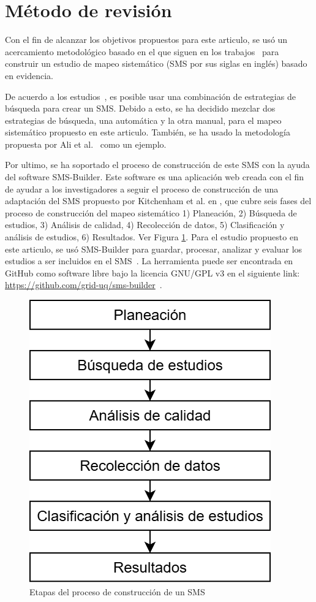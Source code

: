 \section{Método de revisión}\label{sec:metodo-revision}
Con el fin de alcanzar los objetivos propuestos para este articulo, se usó un acercamiento metodológico basado en el que siguen en los trabajos~\cite{Kitchenham2010792, budgen2008using} para construir un estudio de mapeo sistemático (SMS por sus siglas en inglés) basado en evidencia.

De acuerdo a los estudios~\cite{Erica2017HybridSS, Nguyen201562}, es posible usar una combinación de estrategias de búsqueda para crear un SMS. Debido a esto, se ha decidido mezclar dos estrategias de búsqueda, una automática y la otra manual, para el mapeo sistemático propuesto en este articulo. También, se ha usado la metodología propuesta por Ali et al.~\cite{Ali201988196} como un ejemplo.

Por ultimo, se ha soportado el proceso de construcción de este SMS con la ayuda del software SMS-Builder. Este software es una aplicación web creada con el fin de ayudar a los investigadores a seguir el proceso de construcción de una adaptación del SMS propuesto por Kitchenham et al. en \cite{Kitchenham2010792}, que cubre seis fases del proceso de construcción del mapeo sistemático 1) Planeación, 2) Búsqueda de estudios, 3) Análisis de calidad, 4) Recolección de datos, 5) Clasificación y análisis de estudios, 6) Resultados. Ver Figura \ref{figure:Stages}.
Para el estudio propuesto en este articulo, se usó SMS-Builder para guardar, procesar, analizar y evaluar los estudios a ser incluidos en el SMS~\cite{Candela2022100935}. La herramienta puede ser encontrada en GitHub como software libre bajo la licencia GNU/GPL v3 en el siguiente link: \url{https://github.com/grid-uq/sms-builder}~\cite{Candela2022100935}.

\begin{figure}[htbp]
	\centering
	\includegraphics[width=0.6\linewidth]{resources/figures/sms-Etapas.drawio.png}
	\caption{Etapas del proceso de construcción de un SMS}
	\label{figure:Stages}
\end{figure}

